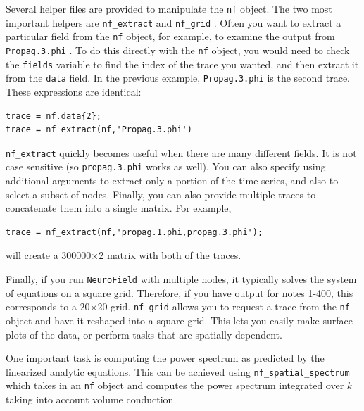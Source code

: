 \documentclass[12pt,a4paper]{article}
\newcommand{\type}[1]{ {\small\small\tt #1} }
\newcommand{\NF}[0]{ \type{NeuroField}}
\begin{document}
Several helper files are provided to manipulate the \type{nf} object. The two most important helpers are \type{nf\_extract} and \type{nf\_grid}. Often you want to extract a particular field from the \type{nf} object, for example, to examine the output from \type{Propag.3.phi}. To do this directly with the \type{nf} object, you would need to check the \type{fields} variable to find the index of the trace you wanted, and then extract it from the \type{data} field. In the previous example, \type{Propag.3.phi} is the second trace. These expressions are identical:
\begin{lstlisting}
trace = nf.data{2};
trace = nf_extract(nf,'Propag.3.phi')
\end{lstlisting}
\type{nf\_extract} quickly becomes useful when there are many different fields. It is not case sensitive (so \type{propag.3.phi} works as well). You can also specify using additional arguments to extract only a portion of the time series, and also to select a subset of nodes. Finally, you can also provide multiple traces to concatenate them into a single matrix. For example,
\begin{lstlisting}
trace = nf_extract(nf,'propag.1.phi,propag.3.phi');
\end{lstlisting}
will create a 300000$\times$2 matrix with both of the traces. 

Finally, if you run \NF with multiple nodes, it typically solves the system of equations on a square grid. Therefore, if you have output for notes 1-400, this corresponds to a 20$\times$20 grid. \type{nf\_grid} allows you to request a trace from the \type{nf} object and have it reshaped into a square grid. This lets you easily make surface plots of the data, or perform tasks that are spatially dependent. 

One important task is computing the power spectrum as predicted by the linearized analytic equations. This can be achieved using \type{nf\_spatial\_spectrum} which takes in an \type{nf} object and computes the power spectrum integrated over $k$ taking into account volume conduction. 
\end{document}
